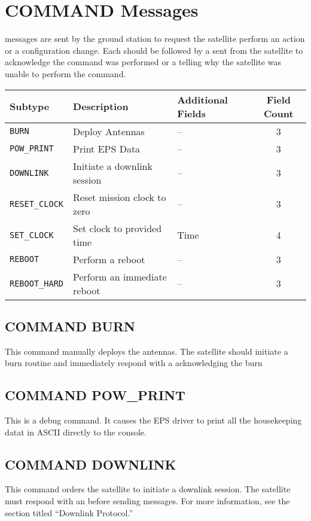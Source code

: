 \documentclass{article}
\begin{document}
\section{COMMAND Messages}
  \mcommand messages are sent by the ground station to request the satellite perform an action
  or a configuration change. Each \mcommand should be followed by a \macommand sent from the satellite
  to acknowledge the command was performed or a \merror telling why the satellite was unable to perform
  the command.
  
  \begin{center}
  \begin{tabular}{| l | l | l | c |}
    \hline
    Subtype & Description & Additional Fields & Field Count \\ \hline
    \texttt{BURN} & Deploy Antennas & -- & 3\\
    \texttt{POW\_PRINT} & Print EPS Data & -- & 3\\
    \texttt{DOWNLINK} & Initiate a downlink session & -- & 3\\
    \texttt{RESET\_CLOCK} & Reset mission clock to zero & -- & 3\\
    \texttt{SET\_CLOCK} & Set clock to provided time & Time & 4\\
    \texttt{REBOOT} & Perform a reboot & -- & 3\\
    \texttt{REBOOT\_HARD} & Perform an immediate reboot & -- & 3\\
    \hline
  \end{tabular}
  \end{center}
  
  \subsection{COMMAND BURN}
  This command manually deploys the antennas. The satellite should initiate a burn routine and immediately respond
  with a \macommand acknowledging the burn
  
  \subsection{COMMAND POW\_PRINT}
  This is a debug command. It causes the EPS driver to print all the housekeeping datat in ASCII directly 
  to the console.
  
  \subsection{COMMAND DOWNLINK}
  This command orders the satellite to initiate a downlink session. The satellite must
  respond with an \macommand before sending \mdownlink messages. For more information,
  see the section titled ``Downlink Protocol.'' 
  
\end{document}
